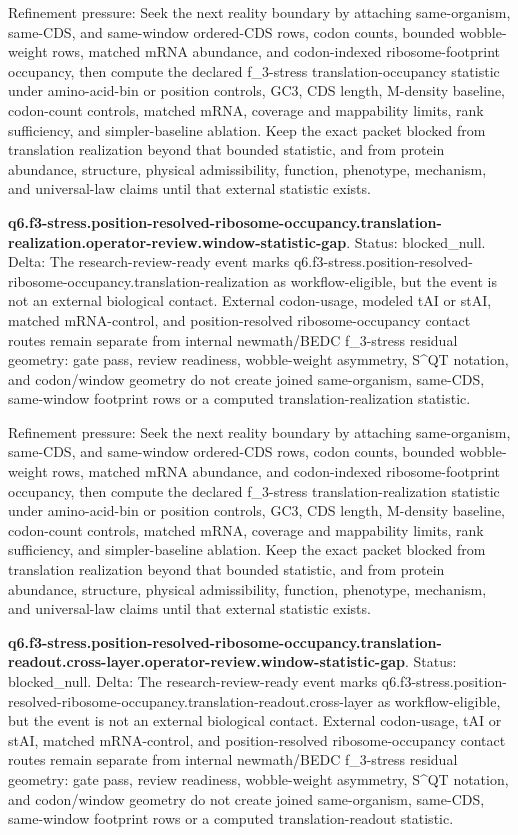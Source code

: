 Refinement pressure: Seek the next reality boundary by attaching same-organism, same-CDS, and same-window ordered-CDS rows, codon counts, bounded wobble-weight rows, matched mRNA abundance, and codon-indexed ribosome-footprint occupancy, then compute the declared f\_3-stress translation-occupancy statistic under amino-acid-bin or position controls, GC3, CDS length, M-density baseline, codon-count controls, matched mRNA, coverage and mappability limits, rank sufficiency, and simpler-baseline ablation. Keep the exact packet blocked from translation realization beyond that bounded statistic, and from protein abundance, structure, physical admissibility, function, phenotype, mechanism, and universal-law claims until that external statistic exists.

\textbf{q6.f3-stress.position-resolved-ribosome-occupancy.translation-realization.operator-review.window-statistic-gap}. Status: blocked\_null. Delta: The research-review-ready event marks q6.f3-stress.position-resolved-ribosome-occupancy.translation-realization as workflow-eligible, but the event is not an external biological contact. External codon-usage, modeled tAI or stAI, matched mRNA-control, and position-resolved ribosome-occupancy contact routes remain separate from internal newmath/BEDC f\_3-stress residual geometry: gate pass, review readiness, wobble-weight asymmetry, S\textasciicircum{}QT notation, and codon/window geometry do not create joined same-organism, same-CDS, same-window footprint rows or a computed translation-realization statistic.

Refinement pressure: Seek the next reality boundary by attaching same-organism, same-CDS, and same-window ordered-CDS rows, codon counts, bounded wobble-weight rows, matched mRNA abundance, and codon-indexed ribosome-footprint occupancy, then compute the declared f\_3-stress translation-realization statistic under amino-acid-bin or position controls, GC3, CDS length, M-density baseline, codon-count controls, matched mRNA, coverage and mappability limits, rank sufficiency, and simpler-baseline ablation. Keep the exact packet blocked from translation realization beyond that bounded statistic, and from protein abundance, structure, physical admissibility, function, phenotype, mechanism, and universal-law claims until that external statistic exists.

\textbf{q6.f3-stress.position-resolved-ribosome-occupancy.translation-readout.cross-layer.operator-review.window-statistic-gap}. Status: blocked\_null. Delta: The research-review-ready event marks q6.f3-stress.position-resolved-ribosome-occupancy.translation-readout.cross-layer as workflow-eligible, but the event is not an external biological contact. External codon-usage, tAI or stAI, matched mRNA-control, and position-resolved ribosome-occupancy contact routes remain separate from internal newmath/BEDC f\_3-stress residual geometry: gate pass, review readiness, wobble-weight asymmetry, S\textasciicircum{}QT notation, and codon/window geometry do not create joined same-organism, same-CDS, same-window footprint rows or a computed translation-readout statistic.

